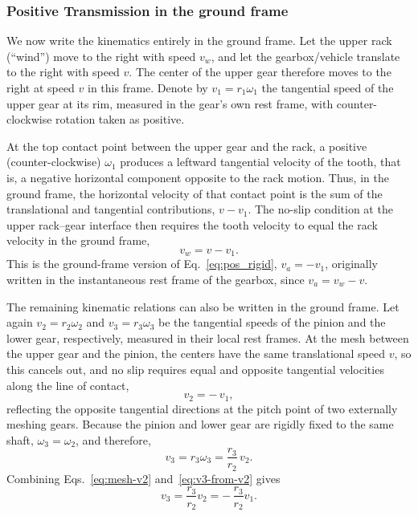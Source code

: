 \documentclass[reprint,aps,pra,longbibliography]{revtex4-2}
\begin{document}
\subsubsection{Positive Transmission in the ground frame}
\label{sec:gearbox-ground-frame}

We now write the kinematics entirely in the ground frame. Let the upper rack
(``wind'') move to the right with speed $v_w$, and let the gearbox/vehicle
translate to the right with speed $v$. The center of the upper gear therefore
moves to the right at speed $v$ in this frame. Denote by
$
v_1 = r_1 \omega_1
$
the tangential speed of the upper gear at its rim, measured in the gear's own
rest frame, with counter-clockwise rotation taken as positive.

At the top contact point between the upper gear and the rack, a positive
(counter-clockwise) \(\omega_1\) produces a leftward tangential velocity of the
tooth, that is, a negative horizontal component opposite to the rack motion.
Thus, in the ground frame, the horizontal velocity of that contact point is
the sum of the translational and tangential contributions, \(v-v_1\).
The no-slip condition at the upper rack--gear interface then requires the tooth
velocity to equal the rack velocity in the ground frame,
\begin{equation}
v_w = v - v_1.
\label{eq:upper-noslip-ground}
\end{equation}
This is the ground-frame version of Eq.~\eqref{eq:pos_rigid}, $v_a = -v_1$, originally written in the instantaneous rest frame of the gearbox, since $v_a=v_w-v$.


The remaining kinematic relations can also be written in the ground frame.
Let again  $
v_2 = r_2 \omega_2$ and $ v_3 = r_3 \omega_3
$
be the tangential speeds of the pinion and the lower gear, respectively,
measured in their local rest frames. At the mesh between the upper gear and the
pinion, the centers have the same translational speed $v$, so this cancels
out, and no slip requires equal and opposite tangential velocities along the
line of contact,
\begin{equation}
v_2 = -\,v_1,
\label{eq:mesh-v2}
\end{equation}
reflecting the opposite tangential directions at the pitch point of two externally meshing gears.
Because the pinion and lower gear are rigidly fixed to the same shaft,  $\omega_3 = \omega_2$, and  therefore,
\begin{equation}
v_3 = r_3 \omega_3 = \frac{r_3}{r_2}\,v_2.
\label{eq:v3-from-v2}
\end{equation}
Combining Eqs.~\eqref{eq:mesh-v2} and~\eqref{eq:v3-from-v2} gives
\begin{equation}
v_3 = \frac{r_3}{r_2} v_2
    = -\,\frac{r_3}{r_2} v_1.
\label{eq:v3-v1}
\end{equation}
\end{document}
